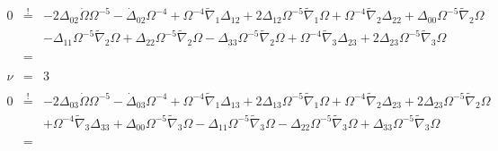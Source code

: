 \documentclass[10pt,letterpaper]{article}
\numberwithin{equation}{section}
\begin{document}
\begin{eqnarray}
\\ \nonumber\\
0& \overset{!}{=}&-2 \Delta_{02} \dot{\Omega} \Omega^{-5}
-  \dot{\Delta}_{02} \Omega^{-4}
+ \Omega^{-4} \tilde{\nabla}_{1}\Delta_{12}
+ 2 \Delta_{12} \Omega^{-5} \tilde{\nabla}_{1}\Omega
+ \Omega^{-4} \tilde{\nabla}_{2}\Delta_{22}
+ \Delta_{00} \Omega^{-5} \tilde{\nabla}_{2}\Omega\nonumber\\
&& -  \Delta_{11} \Omega^{-5} \tilde{\nabla}_{2}\Omega
+ \Delta_{22} \Omega^{-5} \tilde{\nabla}_{2}\Omega
-  \Delta_{33} \Omega^{-5} \tilde{\nabla}_{2}\Omega
+ \Omega^{-4} \tilde{\nabla}_{3}\Delta_{23}
+ 2 \Delta_{23} \Omega^{-5} \tilde{\nabla}_{3}\Omega
\\ \nonumber\\
&=& 
\\ \nonumber\\
\nu &=& 3
\\ \nonumber\\
0& \overset{!}{=}&-2 \Delta_{03} \dot{\Omega} \Omega^{-5}
-  \dot{\Delta}_{03} \Omega^{-4}
+ \Omega^{-4} \tilde{\nabla}_{1}\Delta_{13}
+ 2 \Delta_{13} \Omega^{-5} \tilde{\nabla}_{1}\Omega
+ \Omega^{-4} \tilde{\nabla}_{2}\Delta_{23}
+ 2 \Delta_{23} \Omega^{-5} \tilde{\nabla}_{2}\Omega\nonumber\\
&& + \Omega^{-4} \tilde{\nabla}_{3}\Delta_{33}
+ \Delta_{00} \Omega^{-5} \tilde{\nabla}_{3}\Omega
-  \Delta_{11} \Omega^{-5} \tilde{\nabla}_{3}\Omega
-  \Delta_{22} \Omega^{-5} \tilde{\nabla}_{3}\Omega
+ \Delta_{33} \Omega^{-5} \tilde{\nabla}_{3}\Omega
\\ \nonumber\\
&=& 
\end{eqnarray}
\end{document}
